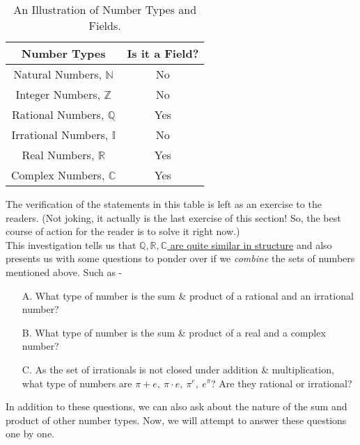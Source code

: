 \renewcommand{\arraystretch}{2.25}
\setlength{\tabcolsep}{20pt}
\begin{table}[H]
  \centering
  \begin{tabular}{|c|c|}
    \hline
    \textbf{Number Types} & \textbf{Is it a Field?} \\ \hline
    Natural Numbers, $\mathbb{N}$ & No \\ \hline
    Integer Numbers, $\mathbb{Z}$ & No \\ \hline
    Rational Numbers, $\mathbb{Q}$ & Yes \\ \hline
    Irrational Numbers, $\mathbb{I}$ & No \\ \hline
    Real Numbers, $\mathbb{R}$ & Yes \\ \hline
    Complex Numbers, $\mathbb{C}$\footnotemark & Yes \\ \hline
  \end{tabular}
  \caption{An Illustration of Number Types and Fields.}
  \label{tab:field_table}
\end{table}
\noindent The verification of the statements in this table is left as an exercise to the readers. (Not joking, it actually is the last exercise of this section! So, the best course of action for the reader is to solve it right now.) \\ This investigation tells us that \underline{$\mathbb{Q},\mathbb{R},\mathbb{C}$ are quite similar in structure} and also presents us with some questions to ponder over if we \textit{combine} the sets of numbers mentioned above. Such as -
\begin{Example}
  \begin{enumerate}
    \item[A.] What type of number is the sum \& product of a rational and an irrational number?
    \item[B.] What type of number is the sum \& product of a real and a complex number?
    \item[C.] As the set of irrationals is not closed under addition \& multiplication, what type of numbers are $\pi+e,\ \pi\cdot e,\ \pi^{e},\ e^{\pi}$? Are they rational or irrational?
\end{enumerate}  
\end{Example}
\noindent In addition to these questions, we can also ask about the nature of the sum and product of other number types. Now, we will attempt to answer these questions one by one. \\
